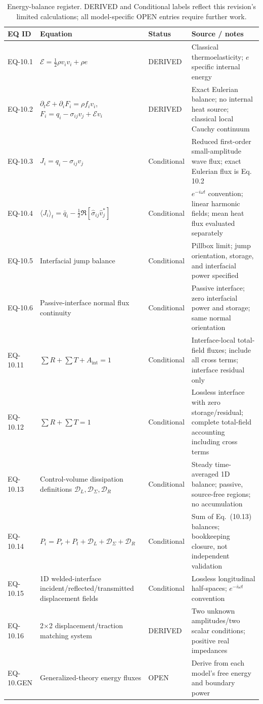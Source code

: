\begin{table}[htbp]
\centering
\small
\setlength{\tabcolsep}{3pt}
\caption{Energy-balance register. DERIVED and Conditional labels reflect this revision's limited calculations; all model-specific OPEN entries require further work.}
\label{tab:appA-sec10}
\begin{tabularx}{\textwidth}{@{}p{1.6cm}Y p{2.8cm}Y@{}}
\toprule
\textbf{EQ ID} & \textbf{Equation} & \textbf{Status} & \textbf{Source / notes} \\
\midrule
EQ-10.1 & $\mathcal{E}=\tfrac12\rho v_i v_i+\rho e$ & DERIVED & Classical thermoelasticity; $e$ specific internal energy \\
EQ-10.2 & $\partial_t\mathcal{E}+\partial_iF_i=\rho f_i v_i$, $F_i=q_i-\sigma_{ij}v_j+\mathcal{E}v_i$ & DERIVED & Exact Eulerian balance; no internal heat source; classical local Cauchy continuum \\
EQ-10.3 & $J_i=q_i-\sigma_{ij}v_j$ & Conditional & Reduced first-order small-amplitude wave flux; exact Eulerian flux is Eq. 10.2 \\
EQ-10.4 & $\langle J_i\rangle_t=\bar q_i-\tfrac12\Re[\hat\sigma_{ij}\hat v_j^*]$ & Conditional & $e^{-i\omega t}$ convention; linear harmonic fields; mean heat flux evaluated separately \\
EQ-10.5 & Interfacial jump balance & Conditional & Pillbox limit; jump orientation, storage, and interfacial power specified \\
EQ-10.6 & Passive-interface normal flux continuity & Conditional & Passive interface; zero interfacial power and storage; same normal orientation \\
EQ-10.11 & $\sum R+\sum T+A_{\mathrm{int}}=1$ & Conditional & Interface-local total-field fluxes; include all cross terms; interface residual only \\
EQ-10.12 & $\sum R+\sum T=1$ & Conditional & Lossless interface with zero storage/residual; complete total-field accounting including cross terms \\
EQ-10.13 & Control-volume dissipation definitions $\mathcal D_L,\mathcal D_\Sigma,\mathcal D_R$ & Conditional & Steady time-averaged 1D balance; passive, source-free regions; no accumulation \\
EQ-10.14 & $P_i=P_r+P_t+\mathcal D_L+\mathcal D_\Sigma+\mathcal D_R$ & Conditional & Sum of Eq.~(10.13) balances; bookkeeping closure, not independent validation \\
EQ-10.15 & 1D welded-interface incident/reflected/transmitted displacement fields & Conditional & Lossless longitudinal half-spaces; $e^{-i\omega t}$ convention \\
EQ-10.16 & 2$\times$2 displacement/traction matching system & DERIVED & Two unknown amplitudes/two scalar conditions; positive real impedances \\
EQ-10.GEN & Generalized-theory energy fluxes & OPEN & Derive from each model's free energy and boundary power \\
\bottomrule
\end{tabularx}
\end{table}

